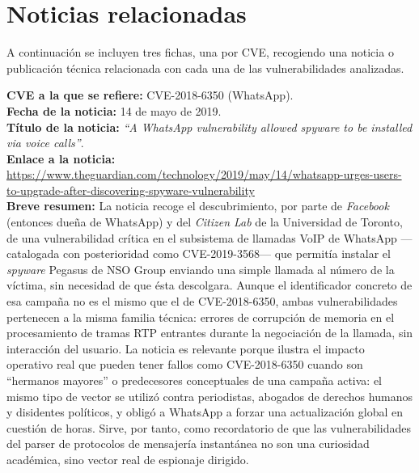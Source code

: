 \chapter{Noticias relacionadas}

A continuación se incluyen tres fichas, una por CVE, recogiendo una noticia o publicación técnica relacionada con cada una de las vulnerabilidades analizadas.

\begin{tcolorbox}[breakable, colback=lightblue, colframe=darkblue, title=\textbf{Ficha de noticia 1}]
\textbf{CVE a la que se refiere:} CVE-2018-6350 (WhatsApp).\\
\textbf{Fecha de la noticia:} 14 de mayo de 2019.\\
\textbf{Título de la noticia:} \textit{``A WhatsApp vulnerability allowed spyware to be installed via voice calls''}.\\
\textbf{Enlace a la noticia:} \url{https://www.theguardian.com/technology/2019/may/14/whatsapp-urges-users-to-upgrade-after-discovering-spyware-vulnerability}\\
\textbf{Breve resumen:} La noticia recoge el descubrimiento, por parte de \textit{Facebook} (entonces dueña de WhatsApp) y del \textit{Citizen Lab} de la Universidad de Toronto, de una vulnerabilidad crítica en el subsistema de llamadas VoIP de WhatsApp ---catalogada con posterioridad como CVE-2019-3568--- que permitía instalar el \textit{spyware} Pegasus de NSO Group enviando una simple llamada al número de la víctima, sin necesidad de que ésta descolgara. Aunque el identificador concreto de esa campaña no es el mismo que el de CVE-2018-6350, ambas vulnerabilidades pertenecen a la misma familia técnica: errores de corrupción de memoria en el procesamiento de tramas RTP entrantes durante la negociación de la llamada, sin interacción del usuario. La noticia es relevante porque ilustra el impacto operativo real que pueden tener fallos como CVE-2018-6350 cuando son ``hermanos mayores'' o predecesores conceptuales de una campaña activa: el mismo tipo de vector se utilizó contra periodistas, abogados de derechos humanos y disidentes políticos, y obligó a WhatsApp a forzar una actualización global en cuestión de horas. Sirve, por tanto, como recordatorio de que las vulnerabilidades del parser de protocolos de mensajería instantánea no son una curiosidad académica, sino vector real de espionaje dirigido.
\end{tcolorbox}

